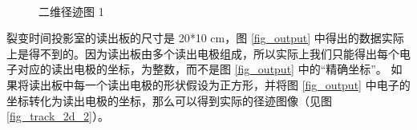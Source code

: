 \documentclass[AutoFakeBold]{LZUThesis}
\begin{document}
\begin{figure}[H]
	\centering
	\\	
    \caption{二维径迹图 1}
    \label{fig_track_2d_1}
\end{figure}

裂变时间投影室的读出板的尺寸是 20*10 cm，图 \ref{fig_output} 中得出的数据实际上是得不到的。因为读出板由多个读出电极组成，所以实际上我们只能得出每个电子对应的读出电极的坐标，为整数，而不是图 \ref{fig_output} 中的“精确坐标”。
如果将读出板中每一个读出电极的形状假设为正方形，并将图 \ref{fig_output} 中电子的坐标转化为读出电极的坐标，那么可以得到实际的径迹图像（见图 \ref{fig_track_2d_2}）。
\end{document}

